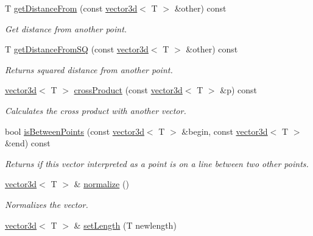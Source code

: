 \begin{DoxyCompactItemize}
T \hyperlink{classirr_1_1core_1_1vector3d_ab838ab8784f4e53453eb45223f624760}{get\+Distance\+From} (const \hyperlink{classirr_1_1core_1_1vector3d}{vector3d}$<$ T $>$ \&other) const
\begin{DoxyCompactList}\small\item\em Get distance from another point. \end{DoxyCompactList}\item 
T \hyperlink{classirr_1_1core_1_1vector3d_a01ba1b5d0cbf1b47245304e62c7fb5a1}{get\+Distance\+From\+SQ} (const \hyperlink{classirr_1_1core_1_1vector3d}{vector3d}$<$ T $>$ \&other) const
\begin{DoxyCompactList}\small\item\em Returns squared distance from another point. \end{DoxyCompactList}\item 
\hyperlink{classirr_1_1core_1_1vector3d}{vector3d}$<$ T $>$ \hyperlink{classirr_1_1core_1_1vector3d_a868da2be92d9b5c05858a17bc580ddd6}{cross\+Product} (const \hyperlink{classirr_1_1core_1_1vector3d}{vector3d}$<$ T $>$ \&p) const
\begin{DoxyCompactList}\small\item\em Calculates the cross product with another vector. \end{DoxyCompactList}\item 
bool \hyperlink{classirr_1_1core_1_1vector3d_abbde78a7c345e22a6fd42f4c84e9038c}{is\+Between\+Points} (const \hyperlink{classirr_1_1core_1_1vector3d}{vector3d}$<$ T $>$ \&begin, const \hyperlink{classirr_1_1core_1_1vector3d}{vector3d}$<$ T $>$ \&end) const
\begin{DoxyCompactList}\small\item\em Returns if this vector interpreted as a point is on a line between two other points. \end{DoxyCompactList}\item 
\hyperlink{classirr_1_1core_1_1vector3d}{vector3d}$<$ T $>$ \& \hyperlink{classirr_1_1core_1_1vector3d_a84a1861464ef70e6965c146732103c09}{normalize} ()
\begin{DoxyCompactList}\small\item\em Normalizes the vector. \end{DoxyCompactList}\item 
\mbox{\label{classirr_1_1core_1_1vector3d_ae593448ac63803b3d254b0e6c7600f28}} 
\hyperlink{classirr_1_1core_1_1vector3d}{vector3d}$<$ T $>$ \& \hyperlink{classirr_1_1core_1_1vector3d_ae593448ac63803b3d254b0e6c7600f28}{set\+Length} (T newlength)

\end{DoxyCompactItemize}
